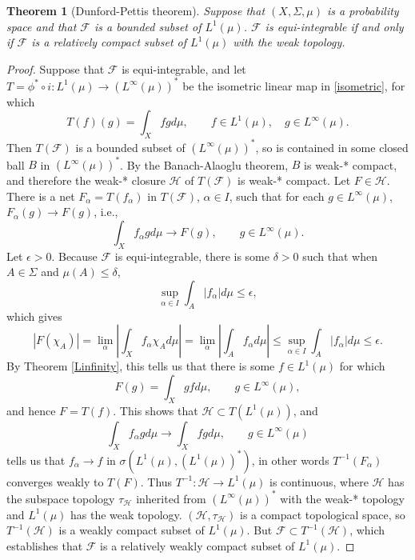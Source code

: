\documentclass{article}
\newtheorem{theorem}{Theorem}
\theoremstyle{definition}
\begin{document}
\begin{theorem}[Dunford-Pettis theorem]
Suppose that $(X,\Sigma,\mu)$ is a probability space and that
  $\mathscr{F}$ is a bounded subset of $L^1(\mu)$. $\mathscr{F}$ is equi-integrable if and only if
$\mathscr{F}$ is a relatively compact subset of $L^1(\mu)$ with the weak topology.
\end{theorem}
\begin{proof}
Suppose that $\mathscr{F}$ is equi-integrable, and let
$T=\phi^* \circ i:L^1(\mu) \to (L^\infty(\mu))^*$ be the isometric linear map  in \eqref{isometric}, for which
\[
T(f)(g) = \int_X f g d\mu, \qquad f \in L^1(\mu), \quad g \in L^\infty(\mu).
\]
Then $T(\mathscr{F})$ is a bounded subset of $(L^\infty(\mu))^*$, so is contained in some closed
ball $B$ in $(L^\infty(\mu))^*$. By the Banach-Alaoglu theorem, $B$ is weak-* compact, and therefore the weak-* closure
$\mathscr{H}$ of $T(\mathscr{F})$ is weak-* compact. Let $F \in \mathscr{H}$. There is a net $F_\alpha=T(f_\alpha)$ in $T(\mathscr{F})$,
$\alpha \in I$, 
such that  for each $g \in L^\infty(\mu)$, $F_\alpha(g) \to F(g)$, i.e.,
\begin{equation}
\int_X f_\alpha g d\mu \to F(g), \qquad g \in L^\infty(\mu).
\label{falpha}
\end{equation}
Let  $\epsilon>0$. Because $\mathscr{F}$ is equi-integrable,
there is some $\delta>0$ such that when $A \in \Sigma$ and $\mu(A) \leq \delta$,
\[
\sup_{\alpha \in I} \int_A |f_\alpha| d\mu \leq \epsilon,
\]
which gives
\[
|F(\chi_A)| = \lim_\alpha  \left| \int_X f_\alpha \chi_A d\mu \right|
= \lim_\alpha \left| \int_A f_\alpha d\mu \right|
\leq \sup_{\alpha \in I} \int_A |f_\alpha| d\mu 
\leq \epsilon.
\]
By Theorem \ref{Linfinity}, this tells us that there is some $f \in L^1(\mu)$ for which
\[
F(g) = \int_X gf d\mu, \qquad g \in L^\infty(\mu),
\]
and hence $F=T(f)$.  This shows that $\mathscr{H} \subset T(L^1(\mu))$, and
\[
\int_X f_\alpha g d\mu \to \int_X f g d\mu, \qquad g \in L^\infty(\mu)
\]
tells us that $f_\alpha \to f$ in $\sigma(L^1(\mu),(L^1(\mu))^*)$, in other words $T^{-1}(F_\alpha)$ converges weakly to $T(F)$.
Thus $T^{-1}:\mathscr{H} \to L^1(\mu)$ is continuous, where $\mathscr{H}$ has the subspace topology $\tau_{\mathscr{H}}$ inherited from
$(L^\infty(\mu))^*$ with the weak-* topology and $L^1(\mu)$ has the weak topology. $(\mathscr{H},\tau_{\mathscr{H}})$ is a compact topological space,
so $T^{-1}(\mathscr{H})$ is a weakly compact subset of $L^1(\mu)$. But $\mathscr{F} \subset T^{-1}(\mathscr{H})$, which establishes that
$\mathscr{F}$ is a relatively weakly compact subset of $L^1(\mu)$.



\end{proof}
\end{document}
